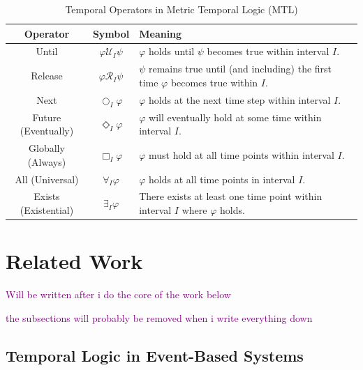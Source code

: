 \documentclass[twocolumn]{article}
\newcommand{\note}[1] {
	\textcolor{Purple}{#1}

}
\begin{document}
\begin{table}[t]
	\centering
	\renewcommand{\arraystretch}{1.5}
	\begin{tabular}{|c|c|l|}
		\hline
		\textbf{Operator}    & \textbf{Symbol}              & \textbf{Meaning}                                                                            \\
		\hline
		Until                & $\varphi \mathcal{U}_I \psi$ & $\varphi$ holds until $\psi$ becomes true within interval $I$.                              \\
		\hline
		Release              & $\varphi \mathcal{R}_I \psi$ & $\psi$ remains true until (and including) the first time $\varphi$ becomes true within $I$. \\
		\hline
		Next                 & $\bigcirc_I \varphi$         & $\varphi$ holds at the next time step within interval $I$.                                  \\
		\hline
		Future (Eventually)  & $\Diamond_I \varphi$         & $\varphi$ will eventually hold at some time within interval $I$.                            \\
		\hline
		Globally (Always)    & $\Box_I \varphi$             & $\varphi$ must hold at all time points within interval $I$.                                 \\
		\hline
		All (Universal)      & $\forall_I \varphi$          & $\varphi$ holds at all time points in interval $I$.                                         \\
		\hline
		Exists (Existential) & $\exists_I \varphi$          & There exists at least one time point within interval $I$ where $\varphi$ holds.             \\
		\hline
	\end{tabular}
	\caption{Temporal Operators in Metric Temporal Logic (MTL)}
	\label{table:mtl_operators}
\end{table}
\vfill


\section{Related Work}

\note{Will be written after i do the core of the work below}
\note{the subsections will probably be removed when i write everything down}
\subsection{Temporal Logic in Event-Based Systems}
\cite{trinh_checking_2024,ganguly_distributed_2024,mackey_early_2024,dong_diagnosis_2023,hendriks_checking_2016,dhananjayan_metric_2014,thati_monitoring_2005,ganguly_runtime_2024}
\end{document}
